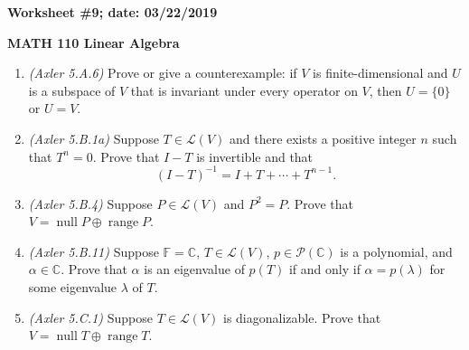 \documentclass{article}
\newcommand{\CC}{\mathbb{C}}
\newcommand{\cL}{\mathcal{L}}
\DeclareMathOperator*{\opnull}{null}
\DeclareMathOperator*{\range}{range}
\begin{document}
{\bf Worksheet \#9; date: 03/22/2019}

{\bf MATH 110 Linear Algebra}

\begin{enumerate}
\item {\em (Axler 5.A.6)} Prove or give a counterexample: if $V$ is finite-dimensional and $U$ is a subspace of $V$ that is invariant under every operator on $V$, then $U = \{0\}$ or $U = V$.

\item {\em (Axler 5.B.1a)} Suppose $T \in \cL(V)$ and there exists a positive integer $n$ such that $T^n = 0$. Prove that $I - T$ is invertible and that
\[
	(I-T)^{-1} = I + T + \cdots + T^{n-1}.
\]

\item {\em (Axler 5.B.4)} Suppose $P \in \cL(V)$ and $P^2 = P$. Prove that $V = \opnull P \oplus \range P$.

\item {\em (Axler 5.B.11)} Suppose $\mathbb{F} = \CC$, $T \in \cL(V)$, $p \in \mathcal{P}(\CC)$ is a polynomial, and $\alpha \in \CC$. Prove that $\alpha$ is an eigenvalue of $p(T)$ if and only if $\alpha = p(\lambda)$ for some eigenvalue $\lambda$ of $T$.

\item {\em (Axler 5.C.1)} Suppose $T \in \cL(V)$ is diagonalizable. Prove that $V = \opnull T \oplus \range T$.
\end{enumerate}
\end{document}
